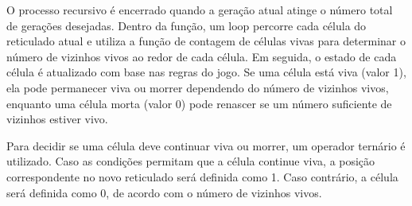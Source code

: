 \documentclass{article}
\begin{document}
O processo recursivo é encerrado quando a geração atual atinge o número total de gerações desejadas. Dentro da função, um loop percorre cada célula do reticulado atual e utiliza a função de contagem de células vivas para determinar o número de vizinhos vivos ao redor de cada célula. Em seguida, o estado de cada célula é atualizado com base nas regras do jogo. Se uma célula está viva (valor 1), ela pode permanecer viva ou morrer dependendo do número de vizinhos vivos, enquanto uma célula morta (valor 0) pode renascer se um número suficiente de vizinhos estiver vivo.

Para decidir se uma célula deve continuar viva ou morrer, um operador ternário é utilizado. Caso as condições permitam que a célula continue viva, a posição correspondente no novo reticulado será definida como 1. Caso contrário, a célula será definida como 0, de acordo com o número de vizinhos vivos.
\end{document}
